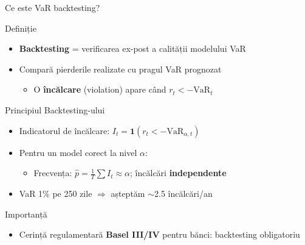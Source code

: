 \documentclass[9pt, aspectratio=169, t]{beamer}
\begin{document}
\begin{frame}{Ce este VaR backtesting?}
    \small
        \begin{block}{Definiție}
            \begin{itemize}
                \item \textbf{Backtesting} = verificarea ex-post a calității modelului VaR
                \item Compară pierderile realizate cu pragul VaR prognozat
                    \begin{itemize}
                        \item O \textbf{încălcare} (violation) apare când $r_t < -\text{VaR}_t$
                    \end{itemize}
            \end{itemize}
        \end{block}
        \vspace{-0.2cm}
        \begin{block}{Principiul Backtesting-ului}
            \begin{itemize}
                \item Indicatorul de încălcare: $I_t = \mathbf{1}(r_t < -\text{VaR}_{\alpha,t})$
                \item Pentru un model corect la nivel $\alpha$:
                    \begin{itemize}
                        \item Frecvența: $\hat{p} = \frac{1}{T}\sum I_t \approx \alpha$; încălcări \textbf{independente}
                    \end{itemize}
                \item VaR 1\% pe 250 zile $\Rightarrow$ așteptăm $\sim$2.5 încălcări/an
            \end{itemize}
        \end{block}
        \vspace{-0.2cm}
        \begin{alertblock}{Importanță}
            \begin{itemize}
                \item Cerință regulamentară \textbf{Basel III/IV} pentru bănci: backtesting obligatoriu
            \end{itemize}
        \end{alertblock}
\end{frame}
\end{document}
